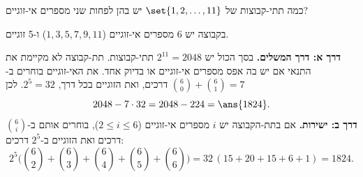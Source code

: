 כמה תתי-קבוצות של $\set{1,2,\dots,11}$ יש בהן לפחות שני מספרים אי-זוגיים?
\begin{solbox}
בקבוצה יש 6 מספרים אי-זוגיים ($1,3,5,7,9,11$) ו-5 זוגיים.

\textbf{דרך א: דרך המשלים.} בסך הכול יש $2^{11}=2048$ תתי-קבוצות. תת-קבוצה לא מקיימת את התנאי אם יש בה אפס מספרים אי-זוגיים או בדיוק אחד. את האי-זוגיים בוחרים ב-$\binom60+\binom61=7$ דרכים, ואת הזוגיים בכל דרך, $2^5=32$. לכן
\[
2048-7\cdot32=2048-224=\ans{1824}.
\]
\textbf{דרך ב: ישירות.} אם בתת-הקבוצה יש $i$ מספרים אי-זוגיים ($2\le i\le6$), בוחרים אותם ב-$\binom6i$ דרכים ואת הזוגיים ב-$2^5$ דרכים:
\[
2^5\Big(\binom62+\binom63+\binom64+\binom65+\binom66\Big)=32\,(15+20+15+6+1)=1824.
\]
\end{solbox}
